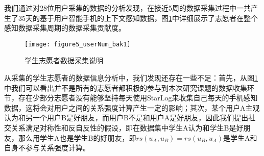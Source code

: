 \par 我们通过对28位用户采集的数据的分析发现，在接近5周的数据采集过程中一共产生了35天的基于用户智能手机的上下文感知数据，图\ref{fig:userNum}中详细展示了志愿者在整个感知数据采集周期的数据采集贡献度。
\begin{figure}[htb]
\centering
\texttt{[image: figure5\_userNum\_bak1]}
\caption{学生志愿者数据采集说明}
\label{fig:userNum}
\end{figure}
\par 从采集的学生志愿者的数据信息分析中，我们发现还存在一些不足：首先，从图\ref{fig:userNum}中我们可以看出并不是所有的志愿者都积极的参与到本次研究课题的数据收集环节，存在少部分志愿者没有能够坚持每天使用StarLog来收集自己每天的手机感知数据，这将会对用户之间的关系强度计算产生一定的影响；其次，某个用户A主观认为和另一个用户B是好朋友，而用户B不是和用户A是好朋友，因此我们提出社交关系满足对称性和反自反性的假设，即在数据集中学生A认为和学生B是好朋友，那么用学生A也是学生B的好朋友，即$rs(u_{A},u_{B})=rs(u_{B},u_{A})$是学生A和自身不参与关系强度计算。

